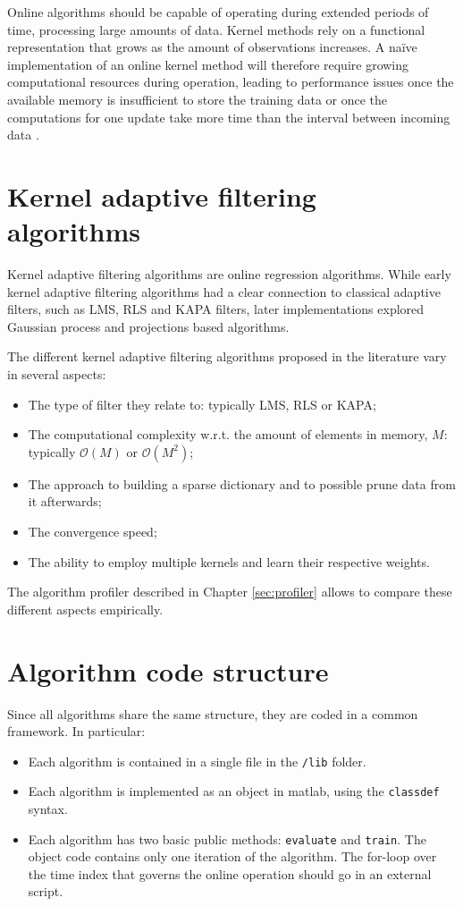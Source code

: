 \documentclass[]{report}
\begin{document}
Online algorithms should be capable of operating during extended periods of time, processing large amounts of data. Kernel methods rely on a functional representation that grows as the amount of observations increases. A na\"ive implementation of an online kernel method will therefore require growing computational resources during operation, leading to performance issues once the available memory is insufficient to store the training data or once the computations for one update take more time than the interval between incoming data \cite{kivinen2004online}.


\section{Kernel adaptive filtering algorithms}

Kernel adaptive filtering algorithms are online regression algorithms. While early kernel adaptive filtering algorithms had a clear connection to classical adaptive filters, such as LMS, RLS and KAPA filters, later implementations explored Gaussian process and projections based algorithms.

The different kernel adaptive filtering algorithms proposed in the literature vary in several aspects:
\begin{itemize}
\item The type of filter they relate to: typically LMS, RLS or KAPA;
\item The computational complexity w.r.t. the amount of elements in memory, $M$: typically $\mathcal{O}(M)$ or $\mathcal{O}(M^2)$;
\item The approach to building a sparse dictionary and to possible prune data from it afterwards;
\item The convergence speed;
\item The ability to employ multiple kernels and learn their respective weights.
\end{itemize}
The algorithm profiler described in Chapter \ref{sec:profiler} allows to compare these different aspects empirically.

\section{Algorithm code structure}

Since all algorithms share the same structure, they are coded in a common framework. In particular:
\begin{itemize}
\item Each algorithm is contained in a single file in the \verb"/lib" folder.
\item Each algorithm is implemented as an object in matlab, using the \verb"classdef" syntax.
\item Each algorithm has two basic public methods: \verb"evaluate" and \verb"train".
The object code contains only one iteration of the algorithm. The for-loop over the time index that governs the online operation should go in an external script.
\end{itemize}
\end{document}
